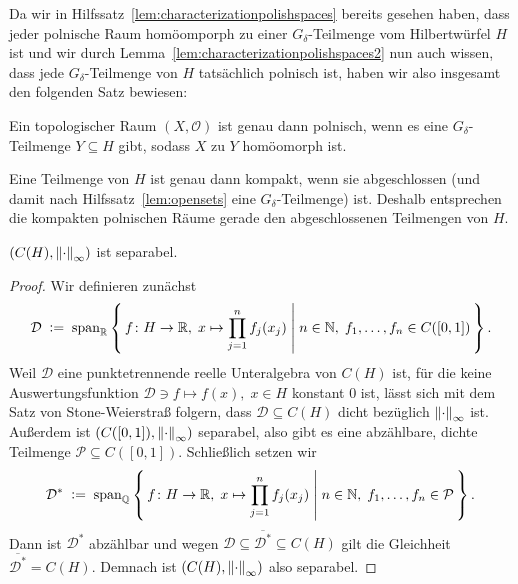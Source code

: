 \documentclass[../main/main.tex]{subfiles}
\begin{document}
	Da wir in Hilfssatz~\ref{lem:characterizationpolishspaces} bereits 
	gesehen haben, dass jeder polnische Raum homöomporph zu einer 
	$G_\delta$-Teilmenge vom Hilbertwürfel $H$ ist und wir durch 
	Lemma~\ref{lem:characterizationpolishspaces2} nun auch wissen, 
	dass jede $G_\delta$-Teilmenge von $H$ tatsächlich polnisch ist, 
	haben wir also insgesamt den folgenden Satz bewiesen:

	\begin{Satz}
		\label{thm:characterizationpolishspaces}
		Ein topologischer Raum $(X, \mathcal{O})$ ist genau dann polnisch, 
		wenn es eine $G_\delta$-Teilmenge $Y \subseteq H$ gibt, sodass $X$ 
		zu $Y$ homöomorph ist. 
	\end{Satz}

	\begin{Bemerkung}
		Eine Teilmenge von $H$ ist genau dann kompakt, wenn sie 
		abgeschlossen (und damit nach Hilfssatz~\ref{lem:opensets} 
		eine $G_\delta$-Teilmenge) ist. Deshalb entsprechen die kompakten 
		polnischen Räume gerade den abgeschlossenen 
		Teilmengen von $H$.
	\end{Bemerkung}

	\begin{Hilfssatz}
		\label{lem:hilbertcubefunctionseparability}
		$(C(H), \left\lVert\cdot\right\rVert_\infty)$ ist separabel.
	\end{Hilfssatz}

	\begin{proof}
		Wir definieren zunächst 
		\[\mathcal{D} \; \vcentcolon = \; \mathrm{span}_{\mathbb{R}} 
			\left\{\, f \colon H \to \mathbb{R}, \; x
			 \mapsto \prod_{j=1}^{n} f_j(x_j)  \; \middle| \; n \in \mathbb{N}, \; f_1,
			\dots,f_n \in C([0, 1]) \,\right\} \text{.}\]
		Weil $\mathcal{D}$ eine punktetrennende reelle 
		Unteralgebra von $C(H)$ ist, für die keine 
		Auswertungsfunktion $\mathcal{D} \ni f \mapsto f(x), 
			\; x \in H$ konstant $0$ ist, lässt sich mit dem 
		Satz von Stone-Weierstraß folgern, dass $\mathcal{D} \subseteq C(H)$ 
		dicht bezüglich $\left\lVert\cdot\right\rVert_\infty$ ist.
		Außerdem ist $(C([0, 1]), \left\lVert\cdot\right\rVert_\infty)$ separabel, 
		also gibt es eine abzählbare, dichte Teilmenge 
		$\mathcal{P} \subseteq C([0, 1])$. Schließlich setzen wir
		\[\mathcal{D}^\ast \; \vcentcolon = \; \mathrm{span}_{\mathbb{Q}} 
			\left\{\, f \colon H \to \mathbb{R}, \; x \mapsto \prod_{j=1}^{n} f_j(x_j)  \; \middle| \; n \in \mathbb{N}, \; f_1,\dots,f_n \in \mathcal{P} \,\right\} \text{.}\]
		Dann ist $\mathcal{D}^\ast$ abzählbar und wegen 
		$ \mathcal{D} \subseteq \overline{\mathcal{D}^\ast} 
		\subseteq C(H)$ gilt die Gleichheit $\overline{\mathcal{D}^\ast} = C(H)$. 
		Demnach ist $(C(H), \left\lVert\cdot\right\rVert_\infty)$ also separabel.
	\end{proof}
\end{document}
